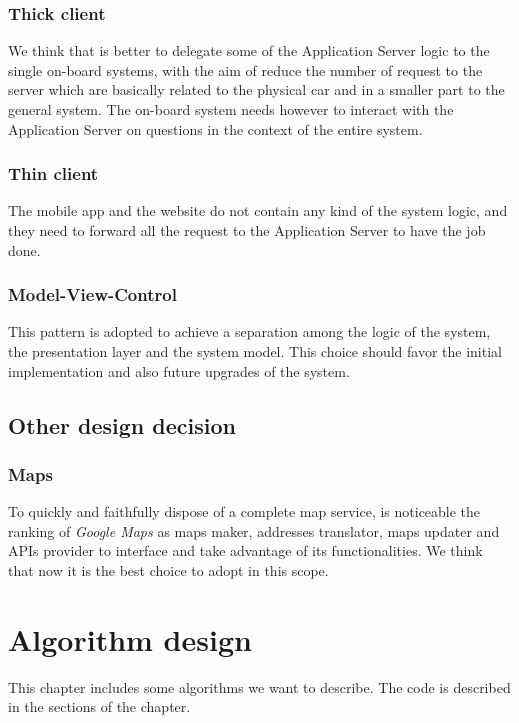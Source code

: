 \documentclass{scrreprt}
\begin{document}
\subsection{Thick client}
We think that is better to delegate some of the Application Server logic to the single on-board systems, with the aim of reduce the number of request to the server which are basically related to the physical car and in a smaller part to the general system.
The on-board system needs however to interact with the Application Server on questions in the context of the entire system.

\subsection{Thin client}
The mobile app and the website do not contain any kind of the system logic, and they need to forward all the request to the Application Server to have the job done.

\subsection{Model-View-Control}
This pattern is adopted to achieve a separation among the logic of the system, the presentation layer and the system model. This choice should favor the initial implementation and also future upgrades of the system.

\section{Other design decision}
\subsection{Maps}
To quickly and faithfully dispose of a complete map service, is noticeable the ranking of \emph{Google Maps} as maps maker, addresses translator, maps updater and APIs provider to interface and take advantage of its functionalities. We think that now it is the best choice to adopt in this scope.


\chapter{Algorithm design}
This chapter includes some algorithms we want to describe. The code is described in the sections of the chapter.

\end{document}
